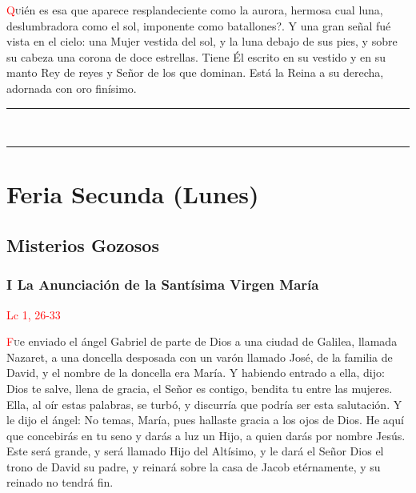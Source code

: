 \documentclass[10pt,twoside]{book}
\begin{document}
\lettrine[lines=2, ante={?`}]{\textcolor{red}{Q}}uién es esa que aparece resplandeciente como la aurora, hermosa cual luna, deslumbradora como el sol, imponente como batallones?.
Y una gran señal fué vista en el cielo: una Mujer vestida del sol, y la luna debajo de sus  pies, y sobre su cabeza una corona de doce estrellas.
Tiene Él escrito en su vestido y en su manto Rey de reyes y Señor de los que dominan. Está la Reina a su derecha, adornada con oro finísimo.

\vspace{0.5em}



\iralfinal

\vspace{0.5em}

\begin{center}
      \begin{spacing}{0.25}
            {\rule{20em}{0.4pt}}\\
            {\rule{20em}{0.4pt}}
      \end{spacing}
\end{center}


\section*{\centering Feria Secunda (Lunes)}

\noindent\subsection*{Misterios Gozosos}

\noindent\subsubsection*{I La Anunciación de la Santísima Virgen María}

\vspace{-0.5em}

\hfill\textcolor{red}{Lc 1, 26-33}

\lettrine[lines=2]{\textcolor{red}{F}}ue enviado el ángel Gabriel de parte de Dios a una ciudad de Galilea, llamada Nazaret, 
a una doncella desposada con un varón llamado José, de la familia de David, y el nombre de la doncella era María. 
Y habiendo entrado a ella, dijo: Dios te salve, llena de gracia, el Señor es contigo, bendita tu entre las mujeres.
Ella, al oír estas palabras, se turbó, y discurría que podría ser esta salutación. Y le dijo el ángel: No temas, María, 
pues hallaste gracia a los ojos de Dios. He aquí que concebirás en tu seno y darás a luz un Hijo, a quien darás por nombre Jesús. 
Este será grande, y será llamado Hijo del Altísimo, y le dará el Señor Dios el trono de David su padre, y reinará sobre la 
casa de Jacob etérnamente, y su reinado no tendrá fin.
\end{document}
